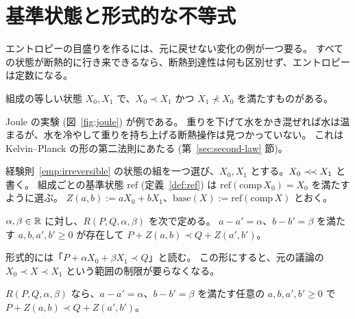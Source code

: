 \section{基準状態と形式的な不等式}

エントロピーの目盛りを作るには、元に戻せない変化の例が一つ要る。
すべての状態が断熱的に行き来できるなら、断熱到達性は何も区別せず、エントロピーは定数になる。

\begin{empirical}[元に戻せない断熱操作がある]
  \label{emp:irreversible}
  \leanok
  組成の等しい状態 $X_0, X_1$ で、$X_0 \prec X_1$ かつ $X_1 \not\prec X_0$ を満たすものがある。
\end{empirical}

Joule の実験 (図~\ref{fig:joule}) が例である。
重りを下げて水をかき混ぜれば水は温まるが、水を冷やして重りを持ち上げる断熱操作は見つかっていない。
これは Kelvin--Planck の形の第二法則にあたる (第~\ref{sec:second-law} 節)。

\begin{definition}[基準状態]
  \label{def:calibration}
  \leanok
  経験則~\ref{emp:irreversible} の状態の組を一つ選び、$X_0, X_1$ とする。$X_0 \mathrel{\prec\!\prec} X_1$ と書く。
  組成ごとの基準状態 $\mathrm{ref}$ (定義~\ref{def:ref}) は $\mathrm{ref}(\mathrm{comp}\, X_0) = X_0$ を満たすように選ぶ。
  $Z(a, b) := a X_0 + b X_1$、$\mathrm{base}(X) := \mathrm{ref}(\mathrm{comp}\, X)$ とおく。
\end{definition}

\begin{definition}[形式的な不等式]
  \label{def:R}
  \leanok
  $\alpha, \beta \in \mathbb{R}$ に対し、$R(P, Q, \alpha, \beta)$ を次で定める。
  $a - a' = \alpha$、$b - b' = \beta$ を満たす $a, b, a', b' \ge 0$ が存在して $P + Z(a, b) \prec Q + Z(a', b')$。
\end{definition}

形式的には「$P + \alpha X_0 + \beta X_1 \prec Q$」と読む。
この形にすると、元の議論の $X_0 \prec X \prec X_1$ という範囲の制限が要らなくなる。

\begin{lemma}[表示によらない]
  \label{lem:R-rep}
  \leanok
  $R(P, Q, \alpha, \beta)$ なら、$a - a' = \alpha$、$b - b' = \beta$ を満たす任意の $a, b, a', b' \ge 0$ で $P + Z(a,b) \prec Q + Z(a',b')$。
\end{lemma}

